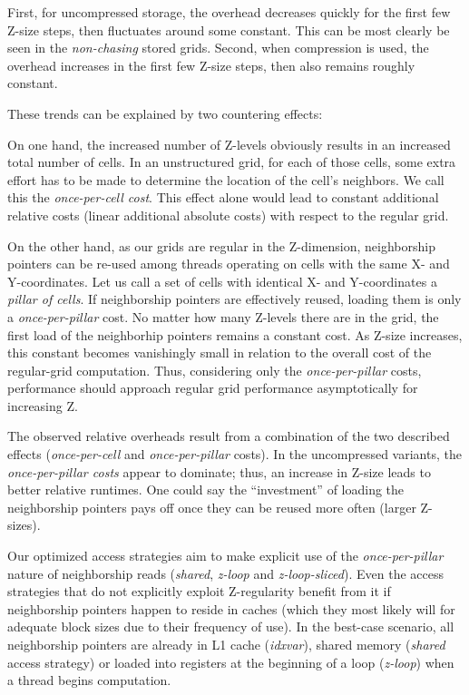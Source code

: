 First, for uncompressed storage, the overhead decreases quickly for the first few Z-size steps, then fluctuates around some constant. This can be most clearly be seen in the \emph{non-chasing} stored grids. Second, when compression is used, the overhead increases in the first few Z-size steps, then also remains roughly constant.

These trends can be explained by two countering effects:

On one hand, the increased number of Z-levels obviously results in an increased total number of cells. In an unstructured grid, for each of those cells, some extra effort has to be made to determine the location of the cell's neighbors. We call this the \emph{once-per-cell cost}. This effect alone would lead to constant additional relative costs (linear additional absolute costs) with respect to the regular grid.

On the other hand, as our grids are regular in the Z-dimension, neighborship pointers can be re-used among threads operating on cells with the same X- and Y-coordinates. Let us call a set of cells with identical X- and Y-coordinates a \emph{pillar of cells}. If neighborship pointers are effectively reused, loading them is only a \emph{once-per-pillar} cost. No matter how many Z-levels there are in the grid, the first load of the neighborhip pointers remains a constant cost. As Z-size increases, this constant becomes vanishingly small in relation to the overall cost of the regular-grid computation. Thus, considering only the \emph{once-per-pillar} costs, performance should approach regular grid performance asymptotically for increasing Z. 

The observed relative overheads result from a combination of the two described effects (\emph{once-per-cell} and \emph{once-per-pillar} costs). In the uncompressed variants, the \emph{once-per-pillar costs} appear to dominate; thus, an increase in Z-size leads to better relative runtimes. One could say the ``investment'' of loading the neighborship pointers pays off once they can be reused more often (larger Z-sizes).

Our optimized access strategies aim to make explicit use of the \emph{once-per-pillar} nature of neighborship reads (\emph{shared}, \emph{z-loop} and \emph{z-loop-sliced}). Even the access strategies that do not explicitly exploit Z-regularity benefit from it if neighborship pointers happen to reside in caches (which they most likely will for adequate block sizes due to their frequency of use).  In the best-case scenario, all neighborship pointers are already in L1 cache (\emph{idxvar}), shared memory (\emph{shared} access strategy) or loaded into registers at the beginning of a loop (\emph{z-loop}) when a thread begins computation.

